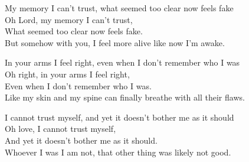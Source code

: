 \begin{lyrics}

My memory I can't trust, what seemed too clear now feels fake\\
Oh Lord, my memory I can't trust,\\
What seemed too clear now feels fake.\\
But somehow with you, I feel more alive like now I'm awake.


In your arms I feel right, even when I don't remember who I was\\
Oh right, in your arms I feel right,\\
Even when I don't remember who I was.\\
Like my skin and my spine can finally breathe with all their flaws.


I cannot trust myself, and yet it doesn't bother me as it should\\
Oh love, I cannot trust myself,\\
And yet it doesn't bother me as it should.\\
Whoever I was I am not, that other thing was likely not good.
\end{lyrics}

